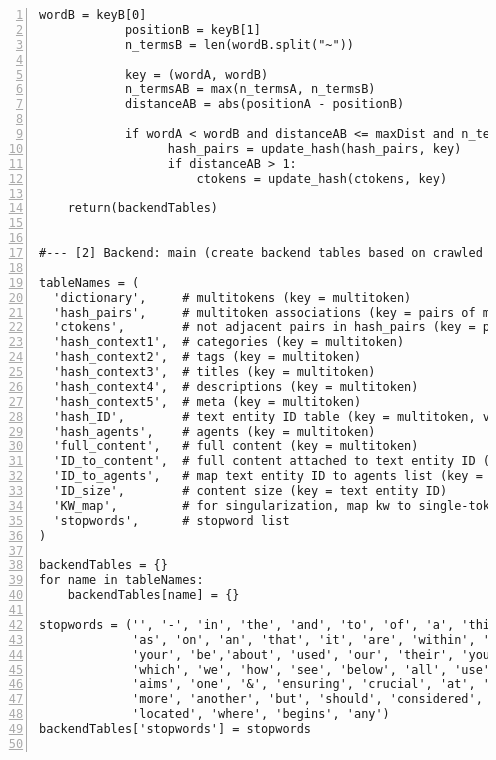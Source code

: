 \documentclass[10pt]{article}
\begin{document}
{\begin{lstlisting}[numbers=left,basicstyle=\ttfamily\footnotesize]
            wordB = keyB[0]
            positionB = keyB[1]
            n_termsB = len(wordB.split("~"))

            key = (wordA, wordB)
            n_termsAB = max(n_termsA, n_termsB)
            distanceAB = abs(positionA - positionB)

            if wordA < wordB and distanceAB <= maxDist and n_termsAB <= maxTerms: 
                  hash_pairs = update_hash(hash_pairs, key) 
                  if distanceAB > 1:
                      ctokens = update_hash(ctokens, key)

    return(backendTables)


#--- [2] Backend: main (create backend tables based on crawled corpus)

tableNames = (
  'dictionary',     # multitokens (key = multitoken)
  'hash_pairs',     # multitoken associations (key = pairs of multitokens)
  'ctokens',        # not adjacent pairs in hash_pairs (key = pairs of multitokens)
  'hash_context1',  # categories (key = multitoken)
  'hash_context2',  # tags (key = multitoken)
  'hash_context3',  # titles (key = multitoken)
  'hash_context4',  # descriptions (key = multitoken)
  'hash_context5',  # meta (key = multitoken)
  'hash_ID',        # text entity ID table (key = multitoken, value is list of IDs)
  'hash_agents',    # agents (key = multitoken)
  'full_content',   # full content (key = multitoken)
  'ID_to_content',  # full content attached to text entity ID (key = text entity ID)
  'ID_to_agents',   # map text entity ID to agents list (key = text entity ID)
  'ID_size',        # content size (key = text entity ID)
  'KW_map',         # for singularization, map kw to single-token dictionary entry
  'stopwords',      # stopword list
)

backendTables = {}
for name in tableNames:
    backendTables[name] = {}

stopwords = ('', '-', 'in', 'the', 'and', 'to', 'of', 'a', 'this', 'for', 'is', 'with', 'from', 
             'as', 'on', 'an', 'that', 'it', 'are', 'within', 'will', 'by', 'or', 'its', 'can', 
             'your', 'be','about', 'used', 'our', 'their', 'you', 'into', 'using', 'these', 
             'which', 'we', 'how', 'see', 'below', 'all', 'use', 'across', 'provide', 'provides',
             'aims', 'one', '&', 'ensuring', 'crucial', 'at', 'various', 'through', 'find', 'ensure',
             'more', 'another', 'but', 'should', 'considered', 'provided', 'must', 'whether',
             'located', 'where', 'begins', 'any')
backendTables['stopwords'] = stopwords


\end{lstlisting}}
\end{document}
